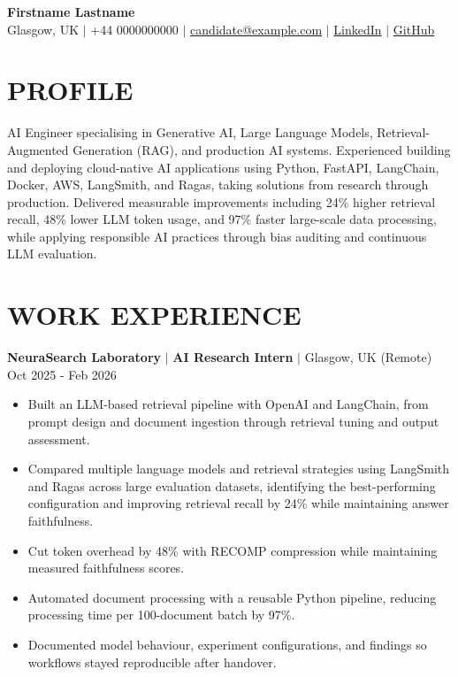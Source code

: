 \documentclass[11pt,a4paper, sans-serif]{article}
\begin{document}
\begin{center}
    {\LARGE \bfseries Firstname Lastname} \\[5pt]
    Glasgow, UK $|$ +44 0000000000 $|$ \href{mailto:candidate@example.com}{candidate@example.com} $|$ 
    \href{https://linkedin.com}{LinkedIn} $|$ \href{https://github.com}{GitHub}
\end{center}

\vspace{10pt}

\section*{PROFILE}
\noindent AI Engineer specialising in Generative AI, Large Language Models, Retrieval-Augmented Generation (RAG), and production AI systems. Experienced building and deploying cloud-native AI applications using Python, FastAPI, LangChain, Docker, AWS, LangSmith, and Ragas, taking solutions from research through production. Delivered measurable improvements including 24\% higher retrieval recall, 48\% lower LLM token usage, and 97\% faster large-scale data processing, while applying responsible AI practices through bias auditing and continuous LLM evaluation.

\section*{WORK EXPERIENCE}

\noindent\textbf{NeuraSearch Laboratory} $|$ \textbf{AI Research Intern} $|$ Glasgow, UK (Remote) \hfill Oct 2025 - Feb 2026
\begin{itemize}[leftmargin=*, nosep]
    \item Built an LLM-based retrieval pipeline with OpenAI and LangChain, from prompt design and document ingestion through retrieval tuning and output assessment.
    \item Compared multiple language models and retrieval strategies using LangSmith and Ragas across large evaluation datasets, identifying the best-performing configuration and improving retrieval recall by 24\% while maintaining answer faithfulness.
    \item Cut token overhead by 48\% with RECOMP compression while maintaining measured faithfulness scores.
    \item Automated document processing with a reusable Python pipeline, reducing processing time per 100-document batch by 97\%.
    \item Documented model behaviour, experiment configurations, and findings so workflows stayed reproducible after handover.
\end{itemize}
\end{document}
